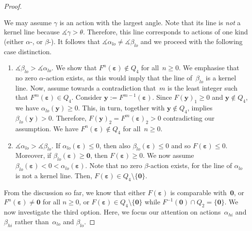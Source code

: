 \documentclass[10pt,a4paper]{amsart}
\newcommand{\eps}{\bm{\varepsilon}}
\begin{document}
\begin{proof}
\begin{enumerate}
			We may assume $\gamma$ is an action with the largest angle. 
			Note that its line is \emph{not} a kernel line because $\measuredangle\gamma > \theta$.
			Therefore, this line corresponds to actions of one kind (either $\alpha$-, or $\beta$-). 
			It follows that $\measuredangle\alpha_{lo} \neq \measuredangle\beta_{lo}$ and we proceed with the following case distinction.
			\begin{enumerate}
				\item $\measuredangle \beta_{lo} > \measuredangle \alpha_{lo}$. 
				We show that $F^n(\eps) \not\in Q_4$ for all~$n \geq 0$. 
				We emphasise that no zero $\alpha$-action exists, as this would imply that the line of~$\beta_{lo}$ is a kernel line.
				Now, assume towards a contradiction that~$m$ is the least integer such that $F^m(\eps) \in Q_4$.
				Consider $\bm{y}:= F^{m-1}(\eps)$.
				Since $F(\bm{y})_1 \geq 0$ and $\bm{y} \not\in Q_4$, we have $\alpha_{lo}(\bm{y}) \geq 0$.
				This, in turn, together with $\bm{y} \not\in Q_4$, implies $\beta_{lo}(\bm{y}) > 0$. Therefore, $F(\bm{y})_2 = F^m(\eps)_2 > 0$ contradicting our assumption.
				We have $F^n(\eps) \not\in Q_4$ for all~$n \geq 0$.
				
				\item $\measuredangle \alpha_{lo} > \measuredangle \beta_{lo}$.
				If $\alpha_{lo}(\eps) \leq 0$, then also $\beta_{lo}(\eps) \leq 0$ and so $F(\eps) \leq 0$.
				Moreover, if $\beta_{lo}(\eps) \geq \bm{0}$, then $F(\eps) \geq 0$.
				We now assume $\beta_{lo}(\eps) < 0 < \alpha_{lo}(\eps)$.
				Note that no zero $\beta$-action exists, for the line of $\alpha_{lo}$ is not a kernel line.  %
				Then, $F(\eps) \in Q_4 \setminus \{\bm{0}\}$.
			\end{enumerate}
		\end{enumerate}
		
		From the discussion so far, we know that either $F(\eps)$ is comparable with~$\bm{0}$, 
		or $F^n(\eps) \neq \bm{0}$ for all $n \geq 0$,
		or $F(\eps) \in Q_4\setminus \{\bm{0}\}$ while $F^{-1}(\bm{0}) \cap Q_2 = \{\bm{0}\}$.
		We now investigate the third option.
		Here, we focus our attention on actions~$\alpha_{hi}$ and $\beta_{hi}$ rather than~$\alpha_{lo}$ and $\beta_{lo}$.
		

\end{proof}
\end{document}
